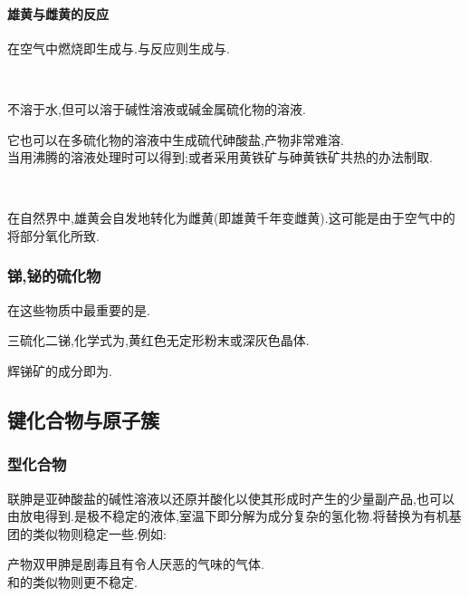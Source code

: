 \documentclass{ctexart}
\begin{document}
\paragraph{雄黄与雌黄的反应}
在空气中燃烧即生成与.与反应则生成与.
\begin{center}
    \\
\end{center}
不溶于水,但可以溶于碱性溶液或碱金属硫化物的溶液.
\begin{center}
\end{center}
它也可以在多硫化物的溶液中生成硫代砷酸盐,产物非常难溶.\\
\indent 当用沸腾的溶液处理时可以得到;或者采用黄铁矿与砷黄铁矿共热的办法制取.
\begin{center}
    \\
\end{center}
在自然界中,雄黄会自发地转化为雌黄(即雄黄千年变雌黄).这可能是由于空气中的将部分氧化所致.
\begin{center}
\end{center}

\subsubsection{锑,铋的硫化物}
在这些物质中最重要的是.
\begin{substance}[\ce{Sb2S3}]
    三硫化二锑,化学式为,黄红色无定形粉末或深灰色晶体.
\end{substance}
辉锑矿的成分即为.
\subsection{键化合物与原子簇}
\subsubsection{型化合物}
联胂是亚砷酸盐的碱性溶液以还原并酸化以使其形成时产生的少量副产品,也可以由放电得到.是极不稳定的液体,室温下即分解为成分复杂的氢化物.将替换为有机基团的类似物则稳定一些.例如:
\begin{center}
\end{center}
产物双甲胂是剧毒且有令人厌恶的气味的气体.\\
\indent {}和的类似物则更不稳定.
\end{document}
